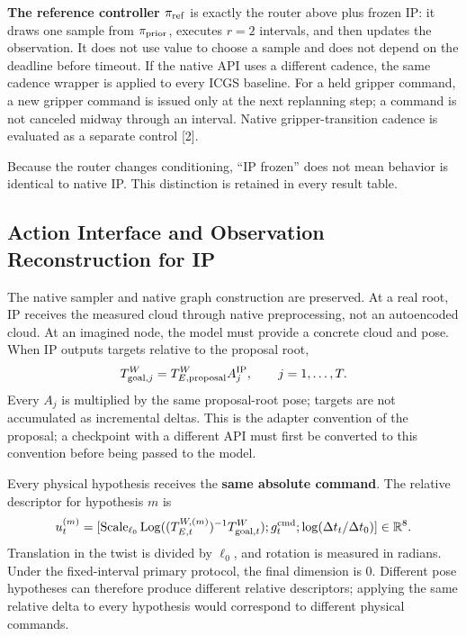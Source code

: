 \documentclass[
  10pt,
]{article}
\begin{document}
\textbf{The reference controller \(\pi_{\rm ref}\)} is exactly the router above plus frozen IP: it draws one sample from \(\pi_{\rm prior}\), executes \(r=2\) intervals, and then updates the observation. It does not use value to choose a sample and does not depend on the deadline before timeout. If the native API uses a different cadence, the same cadence wrapper is applied to every ICGS baseline. For a held gripper command, a new gripper command is issued only at the next replanning step; a command is not canceled midway through an interval. Native gripper-transition cadence is evaluated as a separate control {[}2{]}.

Because the router changes conditioning, ``IP frozen'' does not mean behavior is identical to native IP. This distinction is retained in every result table.

\hypertarget{giao-diux1ec7n-huxe0nh-ux111ux1ed9ng-vuxe0-tuxe1i-tux1ea1o-quan-suxe1t-cho-ip}{%
\subsection{Action Interface and Observation Reconstruction for IP}\label{giao-diux1ec7n-huxe0nh-ux111ux1ed9ng-vuxe0-tuxe1i-tux1ea1o-quan-suxe1t-cho-ip}}

The native sampler and native graph construction are preserved. At a real root, IP receives the measured cloud through native preprocessing, not an autoencoded cloud. At an imagined node, the model must provide a concrete cloud and pose. When IP outputs targets relative to the proposal root,
\begin{equation}\label{eq:actionbridge}
T^W_{{\rm goal},j}=T^W_{E,{\rm proposal}}A_j^{\rm IP},\qquad j=1,\ldots,T.
\end{equation}
Every \(A_j\) is multiplied by the same proposal-root pose; targets are not accumulated as incremental deltas. This is the adapter convention of the proposal; a checkpoint with a different API must first be converted to this convention before being passed to the model.

Every physical hypothesis receives the \textbf{same absolute command}. The relative descriptor for hypothesis \(m\) is
\begin{equation}\label{eq:actiondesc}
u_t^{(m)}=
[\operatorname{Scale}_{\ell_0}\operatorname{Log}((T_{E,t}^{W,(m)})^{-1}T^W_{{\rm goal},t});
g_t^{\rm cmd};\log(\Delta t_t/\Delta t_0)]\in\mathbb R^8.
\end{equation}
Translation in the twist is divided by \(\ell_0\), and rotation is measured in radians. Under the fixed-interval primary protocol, the final dimension is 0. Different pose hypotheses can therefore produce different relative descriptors; applying the same relative delta to every hypothesis would correspond to different physical commands.
\end{document}
